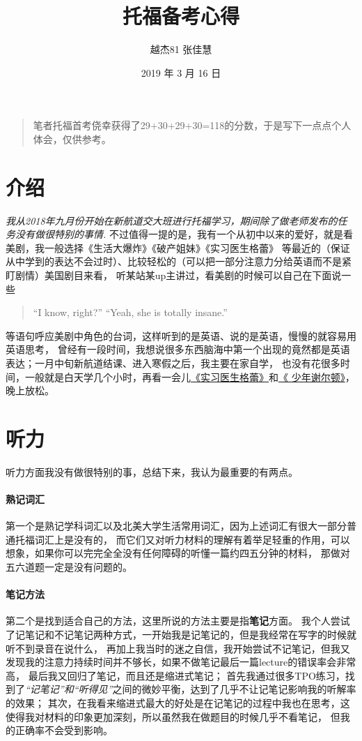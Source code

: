 \documentclass[blue,cn, normal]{elegantnoteex}
\title{托福备考心得}
\author{越杰81  张佳慧}
\institute{小破楼资料编写小组\LaTeX}
\date{2019 年 3 月 16 日}
\begin{document}
\maketitle
\newpage
\tableofcontents
\newpage

\vspace{1cm}
	\begin{quotation}
		
		{\fangsong 笔者托福首考侥幸获得了29+30+29+30=118的分数，于是写下一点点个人体会，仅供参考。}
		
	\end{quotation}
\section{介绍}        
    \emph{我从2018年九月份开始在新航道交大班进行托福学习，期间除了做老师发布的任务没有做很特别的事情.}
    不过值得一提的是，我有一个从初中以来的爱好，就是看美剧，我一般选择《生活大爆炸》《破产姐妹》《实习医生格蕾》
    等最近的（保证从中学到的表达不会过时）、比较轻松的（可以把一部分注意力分给英语而不是紧盯剧情）美国剧目来看，
    听某站某up主讲过，看美剧的时候可以自己在下面说一些
    \begin{quote}
        “I know, right?” 
        “Yeah, she is totally insane.”
    \end{quote}
    等语句呼应美剧中角色的台词，这样听到的是英语、说的是英语，慢慢的就容易用英语思考，
    曾经有一段时间，我想说很多东西脑海中第一个出现的竟然都是英语表达；一月中旬新航道结课、进入寒假之后，我主要在家自学，
    也没有花很多时间，一般就是白天学几个小时，再看一会儿\underline{《实习医生格蕾》}和\underline{《 少年谢尔顿》}，晚上放松。

\section{听力}

    听力方面我没有做很特别的事，总结下来，我认为最重要的有两点。


\paragraph{熟记词汇}
    第一个是熟记学科词汇以及北美大学生活常用词汇，因为上述词汇有很大一部分普通托福词汇上是没有的，
    而它们又对听力材料的理解有着举足轻重的作用，可以想象，如果你可以完完全全没有任何障碍的听懂一篇约四五分钟的材料，
    那做对五六道题一定是没有问题的。

\paragraph{笔记方法}
    第二个是找到适合自己的方法，这里所说的方法主要是指\textbf{笔记}方面。
    我个人尝试了记笔记和不记笔记两种方式，一开始我是记笔记的，但是我经常在写字的时候就听不到录音在说什么，
    再加上我当时的迷之自信，我开始尝试不记笔记，但我又发现我的注意力持续时间并不够长，如果不做笔记最后一篇lecture的错误率会非常高，
    最后我又回归了笔记，而且还是缩进式笔记；
    首先我通过很多TPO练习，找到了\textit{“记笔记”和“听得见”}之间的微妙平衡，达到了几乎不让记笔记影响我的听解率的效果；
    其次，在我看来缩进式最大的好处是在记笔记的过程中我也在思考，这使得我对材料的印象更加深刻，所以虽然我在做题目的时候几乎不看笔记，
    但我的正确率不会受到影响。
\end{document}
